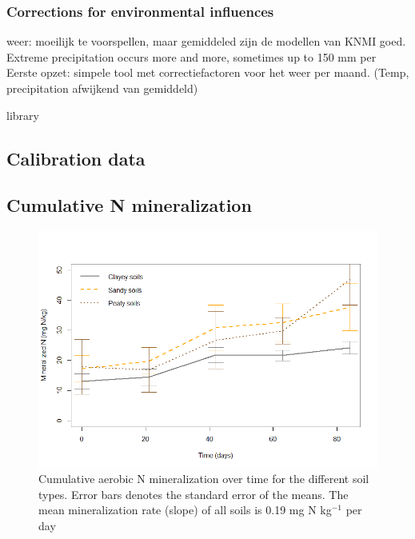 \documentclass[10pt,twoside,dutch,english]{report}
\begin{document}
    \subsection{Corrections for environmental influences}
	weer: moeilijk te voorspellen, maar gemiddeled zijn de modellen van KNMI goed. Extreme precipitation occurs more and more, sometimes up to 150 mm per
    Eerste opzet: simpele tool met correctiefactoren voor het weer per maand. (Temp, precipitation afwijkend van gemiddeld)



\linespread{1.0}
\footnotesize 
{}

 {library}
\normalsize 
\linespread{1.3}




\begin{appendices}
\makeatletter
{}
\makeatother

\chapter{Calibration data}
	\label{chap: Calibration data}
\section{Cumulative N mineralization }
	\begin{figure}[h] %
	\centering
	\includegraphics[width=0.8\linewidth]{results_Ncum}
	\caption{Cumulative aerobic N mineralization over time for the different soil types. Error bars denotes the standard error of the means. The mean mineralization rate (slope) of all soils is 0.19 mg N kg$^{-1}$ per day}
	\label{fig:results_Ncum}
\end{figure}


\end{appendices}
\end{document}
